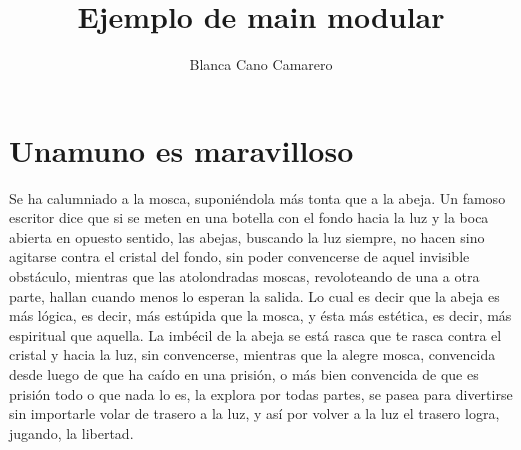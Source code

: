 \documentclass[a4paper , 11pt , spanish]{book}
\title{Ejemplo de main modular}
\author{
Blanca Cano Camarero \\
}
\begin{document}

\maketitle 

\newpage 
\section{ Unamuno es maravilloso}
 Se ha calumniado a la mosca, suponiéndola más tonta que a la abeja. Un famoso escritor dice que si se meten en una botella con el  fondo hacia la luz y la boca abierta en opuesto sentido, las abejas, buscando la luz siempre, no hacen sino agitarse contra el cristal del fondo, sin poder convencerse de aquel invisible obstáculo, mientras que las atolondradas moscas, revoloteando de una a otra parte, hallan cuando menos lo esperan la salida. Lo cual es decir que la abeja es más lógica, es decir, más estúpida que la mosca, y ésta más estética, es decir, más espiritual que aquella. La imbécil de la abeja se está rasca que te rasca contra el cristal y hacia la luz, sin convencerse, mientras que la alegre mosca, convencida desde luego de que ha caído en una prisión, o más bien convencida de que es prisión todo o que nada lo es, la explora por todas partes, se pasea para divertirse sin importarle volar de trasero a la luz, y así por volver a la luz el trasero logra, jugando, la libertad.

\section*{}

\end{document}
